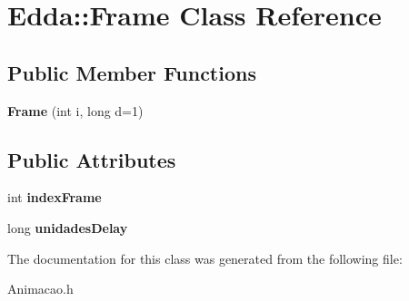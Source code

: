 \hypertarget{class_edda_1_1_frame}{
\section{Edda::Frame Class Reference}
\label{class_edda_1_1_frame}
}
\subsection*{Public Member Functions}
\begin{DoxyCompactItemize}
\item 
\hypertarget{class_edda_1_1_frame_adc9957b371722fdb61270cf17a7651e8}{
{\bfseries Frame} (int i, long d=1)}
\label{class_edda_1_1_frame_adc9957b371722fdb61270cf17a7651e8}

\end{DoxyCompactItemize}
\subsection*{Public Attributes}
\begin{DoxyCompactItemize}
\item 
\hypertarget{class_edda_1_1_frame_ae64bf41c79f414270a7c686bafa23a79}{
int {\bfseries indexFrame}}
\label{class_edda_1_1_frame_ae64bf41c79f414270a7c686bafa23a79}

\item 
\hypertarget{class_edda_1_1_frame_ac28f41c0035b31f46bd29ee68006edc9}{
long {\bfseries unidadesDelay}}
\label{class_edda_1_1_frame_ac28f41c0035b31f46bd29ee68006edc9}

\end{DoxyCompactItemize}


The documentation for this class was generated from the following file:\begin{DoxyCompactItemize}
\item 
Animacao.h\end{DoxyCompactItemize}
